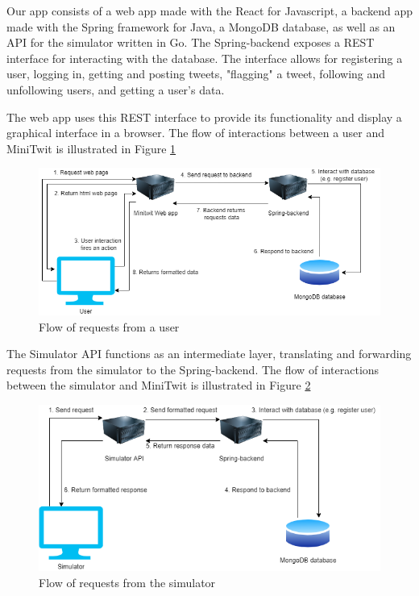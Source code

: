 Our app consists of a web app made with the React for Javascript, a backend app made with the Spring framework for Java, a MongoDB database, as well as an API for the simulator written in Go.
The Spring-backend exposes a REST interface for interacting with the database. The interface allows for registering a user, logging in, getting and posting tweets, "flagging" a tweet, following and unfollowing users, and getting a user's data.

The web app uses this REST interface to provide its functionality and display a graphical interface in a browser. The flow of interactions between a user and MiniTwit is illustrated in Figure \ref{fig:informal_flow}

\begin{figure}[h]
    \centering
    \includegraphics[width=\textwidth]{images/Minitwit flow.drawio.png}
    \caption{Flow of requests from a user}
    \label{fig:informal_flow}
\end{figure}

The Simulator API functions as an intermediate layer, translating and forwarding requests from the simulator to the Spring-backend. The flow of interactions between the simulator and MiniTwit is illustrated in Figure \ref{fig:informal_simulator}

\begin{figure}[h]
    \centering
    \includegraphics[width=\textwidth]{images/Minitwit simulator.drawio.png}
    \caption{Flow of requests from the simulator}
    \label{fig:informal_simulator}
\end{figure}
